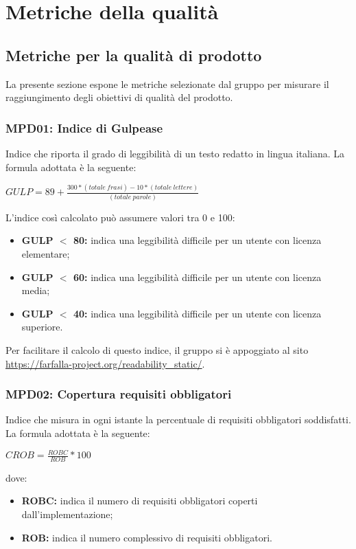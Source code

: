 \section{Metriche della qualità}
\subsection{Metriche per la qualità di prodotto}
La presente sezione espone le metriche selezionate dal gruppo \groupName{} per misurare il raggiungimento degli obiettivi di qualità del prodotto.

\subsubsection{MPD01: Indice di Gulpease}\label{sssec:indice_gulpease}
Indice che riporta il grado di leggibilità di un testo redatto in lingua italiana.
La formula adottata è la seguente:
\begin{center}
    $GULP = 89 + \displaystyle \frac{300*(totale\ frasi)-10*(totale\ lettere)}{(totale\ parole)}$
\end{center}
L'indice così calcolato può assumere valori tra 0 e 100:
\begin{itemize}
    \item \textbf{GULP $<$ 80:} indica una leggibilità difficile per un utente con licenza elementare;
    \item \textbf{GULP $<$ 60:} indica una leggibilità difficile per un utente con licenza media;
    \item \textbf{GULP $<$ 40:} indica una leggibilità difficile per un utente con licenza superiore.
\end{itemize}

Per facilitare il calcolo di questo indice, il gruppo si è appoggiato al sito \url{https://farfalla-project.org/readability_static/}.

\subsubsection{MPD02: Copertura requisiti obbligatori}\label{sssec:requisiti_obbligatori}
Indice che misura in ogni istante la percentuale di requisiti obbligatori soddisfatti.
La formula adottata è la seguente:
\begin{center}
    $CROB = \displaystyle \frac{ROBC}{ROB}*100$
\end{center}
dove:
\begin{itemize}
    \item \textbf{ROBC:} indica il numero di requisiti obbligatori coperti dall'implementazione;
    \item \textbf{ROB:} indica il numero complessivo di requisiti obbligatori.
\end{itemize}

